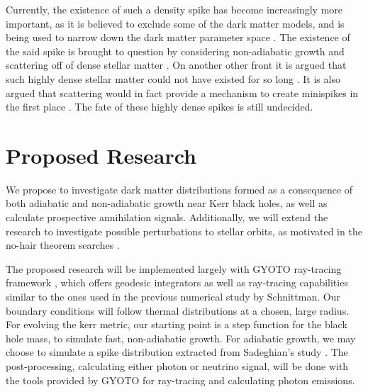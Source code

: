\documentclass[a4paper,10pt]{article}
\begin{document}
Currently, the existence of such a density spike has become 
increasingly more important, as it  
is believed to exclude some of the dark matter models, and is 
being used to narrow down the dark matter parameter space \citep{observational_get_it_from_the_criticism_article}. 
The existence of the said spike is brought to question by 
considering non-adiabatic growth and scattering off of dense 
stellar matter \citep{P_Ullio_2001}. On another other front it is 
argued that such highly dense stellar matter could not have existed 
for so long \citep{I_dont_remember_this_one}. 
It is also argued that scattering would in fact provide a mechanism 
to create 
minispikes in the first place \citep{gnedin_primack_2004}. The 
fate of these highly dense spikes is still undecided.

\section{Proposed Research}


We propose to investigate dark matter distributions formed as a consequence of both adiabatic and non-adiabatic growth near Kerr black holes, 
as well as calculate prospective annihilation signals. 
Additionally, we will extend the research to investigate possible perturbations to 
stellar orbits, as motivated in the no-hair theorem searches \citep{Sadeghian_Ferrer_Will_2013}.


The proposed research will be implemented largely with GYOTO ray-tracing framework \citep{gyoto_vincent_2011}, which 
offers geodesic integrators as well as ray-tracing capabilities similar to the ones used in the previous numerical study by 
Schnittman. Our boundary conditions will follow thermal distributions at a chosen, large radius. 
For evolving the kerr metric, our starting point is a step function for the black hole mass, to simulate fast, 
non-adiabatic growth. %
For adiabatic growth, we may choose to simulate a spike distribution extracted from Sadeghian's 
study \citep{Sadeghian_Ferrer_Will_2013}. The post-processing, calculating either photon or neutrino signal, 
will be done with the tools provided by GYOTO for ray-tracing and 
calculating photon emissions.
\end{document}

